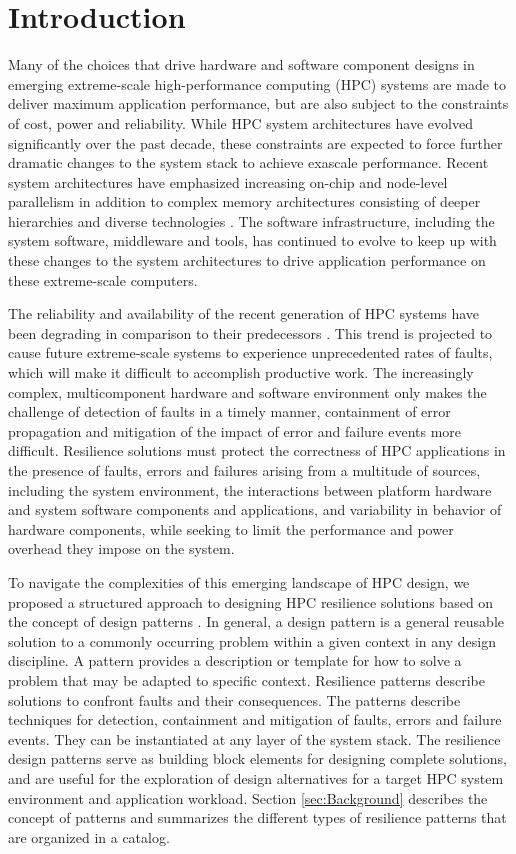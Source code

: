 \section{Introduction}
\label{sec:Introduction}
 
Many of the choices that drive hardware and software component designs in emerging extreme-scale high-performance computing (HPC) systems are made to deliver maximum application performance, but are also subject to the constraints of cost, power and reliability. While HPC system architectures have evolved significantly over the past decade, these constraints are expected to force further dramatic changes to the system stack to achieve exascale performance.  
Recent system architectures have emphasized increasing on-chip and node-level parallelism in addition to complex memory architectures consisting of deeper hierarchies and diverse technologies \cite{Shalf:2010}. The software infrastructure, including the system software, middleware and tools, has continued to evolve to keep up with these changes to the system architectures to drive application performance on these extreme-scale computers.  

The reliability and availability of the recent generation of HPC systems have been degrading in comparison to their predecessors \cite{Geist:2016}. This trend is projected to cause future extreme-scale systems to experience unprecedented rates of faults, which will make it difficult to accomplish productive work. The increasingly complex, multicomponent hardware and software environment only makes the challenge of detection of faults in a timely manner, containment of error propagation and mitigation of the impact of error and failure events more difficult.
Resilience solutions must protect the correctness of HPC applications in the presence of faults, errors and failures arising from a multitude of sources, including the system environment, the interactions between platform hardware and system software components and applications, and variability in behavior of hardware components, while seeking to limit the performance and power overhead they impose on the system.  

To navigate the complexities of this emerging landscape of HPC design, we proposed a structured approach to designing HPC resilience solutions based on the concept of design patterns \cite{Hukerikar:2017}. In general, a design pattern is a general reusable solution to a commonly occurring problem within a given context in any design discipline. A pattern provides a description or template for how to solve a problem that may be adapted to specific context. Resilience patterns describe solutions to confront faults and their consequences. The patterns describe techniques for detection, containment and mitigation of faults, errors and failure events. They can be instantiated at any layer of the system stack. The resilience design patterns serve as building block elements for designing complete solutions, and are useful for the exploration of design alternatives for a target HPC system environment and application workload. Section \ref{sec:Background} describes the concept of patterns and summarizes the different types of resilience patterns that are organized in a catalog.  

